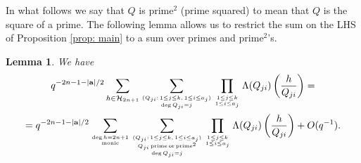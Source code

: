 \documentclass[alphabetic, 
        colorlinks,
        linkcolor=red,  citecolor=blue,
        backref
]{amsart}
\numberwithin{equation}{section}
\newtheorem{lem}[claim]{Lemma}
\theoremstyle{definition}
\begin{document}
In what follows we say that $Q$ is $\text{prime}^2$ (prime squared) to mean that $Q$ is the square of a prime. The following lemma allows us to restrict the sum on the LHS of Proposition \ref{prop: main} to a sum over primes and prime$^2$'s.

\begin{lem}\label{prop_not_prime_or_square_or_non_square_free_is_ngeligible} We have
    \begin{multline*}
    q^{-2n-1-|\mathbf a|/2}\sum_{h\in\mathcal{H}_{2n+1}}\sum_{(Q_{ji}:\,1\le j\le k,\,1\le i\le a_j)\atop{\deg Q_{ji}=j}}\prod_{1\le j\le k\atop{1\le i\le a_j}}\Lambda(Q_{ji})\left(\frac h{Q_{ji}}\right)=\\
    =q^{-2n-1-|\mathbf a|/2}\sum_{\deg h=2n+1\atop{\mathrm{monic}}}\sum_{(Q_{ji}:\,1\le j\le k,\,1\le i\le a_j)\atop{Q_{ji}\mathrm{\, prime\,or\, prime}^2\atop{\deg Q_{ji}=j}}}\prod_{1\le j\le k\atop{1\le i\le a_j}}\Lambda(Q_{ji})\left(\frac h{Q_{ji}}\right)+O(q^{-1}).
    \end{multline*}
\end{lem}
\end{document}
